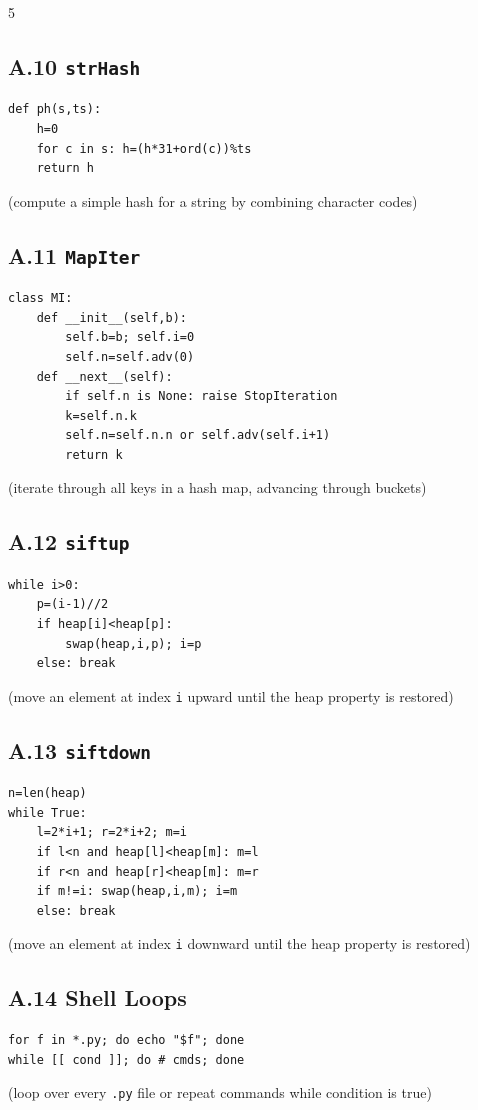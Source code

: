 \documentclass[6pt,landscape]{article}
\begin{document}
\begin{multicols}{5}
\subsection{A.10 \texttt{strHash}}\label{code:A10}
\begin{verbatim}
def ph(s,ts):
    h=0
    for c in s: h=(h*31+ord(c))%ts
    return h
\end{verbatim}
(compute a simple hash for a string by combining character codes)

\subsection{A.11 \texttt{MapIter}}\label{code:A11}
\begin{verbatim}
class MI:
    def __init__(self,b):
        self.b=b; self.i=0
        self.n=self.adv(0)
    def __next__(self):
        if self.n is None: raise StopIteration
        k=self.n.k
        self.n=self.n.n or self.adv(self.i+1)
        return k
\end{verbatim}
(iterate through all keys in a hash map, advancing through buckets)

\subsection{A.12 \texttt{siftup}}\label{code:A12}
\begin{verbatim}
while i>0:
    p=(i-1)//2
    if heap[i]<heap[p]:
        swap(heap,i,p); i=p
    else: break
\end{verbatim}
(move an element at index \texttt{i} upward until the heap property is restored)

\subsection{A.13 \texttt{siftdown}}\label{code:A13}
\begin{verbatim}
n=len(heap)
while True:
    l=2*i+1; r=2*i+2; m=i
    if l<n and heap[l]<heap[m]: m=l
    if r<n and heap[r]<heap[m]: m=r
    if m!=i: swap(heap,i,m); i=m
    else: break
\end{verbatim}
(move an element at index \texttt{i} downward until the heap property is restored)

\subsection{A.14 Shell Loops}\label{code:A14}
\begin{verbatim}
for f in *.py; do echo "$f"; done
while [[ cond ]]; do # cmds; done
\end{verbatim}
(loop over every \texttt{.py} file or repeat commands while condition is true)


\end{multicols}
\end{document}
